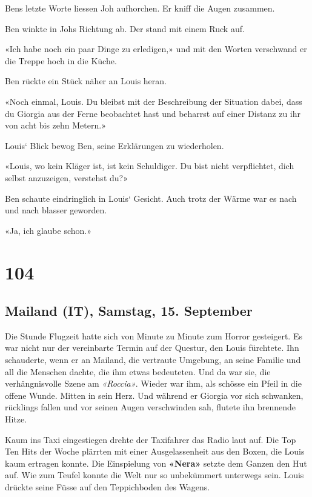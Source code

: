 Bens letzte Worte liessen Joh aufhorchen. Er kniff die Augen zusammen.

Ben winkte in Johs Richtung ab. Der stand mit einem Ruck auf.

«Ich habe noch ein paar Dinge zu erledigen,» und mit den Worten
verschwand er die Treppe hoch in die Küche.

Ben rückte ein Stück näher an Louis heran.

«Noch einmal, Louis. Du bleibst mit der Beschreibung der Situation
dabei, dass du Giorgia aus der Ferne beobachtet hast und beharrst auf
einer Distanz zu ihr von acht bis zehn Metern.»

Louis` Blick bewog Ben, seine Erklärungen zu wiederholen.

«Louis, wo kein Kläger ist, ist kein Schuldiger. Du bist nicht
verpflichtet, dich selbst anzuzeigen, verstehst du?»

Ben schaute eindringlich in Louis` Gesicht. Auch trotz der Wärme war es
nach und nach blasser geworden.

«Ja, ich glaube schon.»

\chapter{104}\label{section-104}

\section{Mailand (IT), Samstag, 15.
September}\label{mailand-it-samstag-15.-september}

Die Stunde Flugzeit hatte sich von Minute zu Minute zum Horror
gesteigert. Es war nicht nur der vereinbarte Termin auf der Questur, den
Louis fürchtete. Ihn schauderte, wenn er an Mailand, die vertraute
Umgebung, an seine Familie und all die Menschen dachte, die ihm etwas
bedeuteten. Und da war sie, die verhängnisvolle Szene am
\emph{«Roccia»}. Wieder war ihm, als schösse ein Pfeil in die offene
Wunde. Mitten in sein Herz. Und während er Giorgia vor sich schwanken,
rücklings fallen und vor seinen Augen verschwinden sah, flutete ihn
brennende Hitze.

Kaum ins Taxi eingestiegen drehte der Taxifahrer das Radio laut auf. Die
Top Ten Hits der Woche plärrten mit einer Ausgelassenheit aus den Boxen,
die Louis kaum ertragen konnte. Die Einspielung von \textbf{«Nera»}
setzte dem Ganzen den Hut auf. Wie zum Teufel konnte die Welt nur so
unbekümmert unterwegs sein. Louis drückte seine Füsse auf den
Teppichboden des Wagens.

